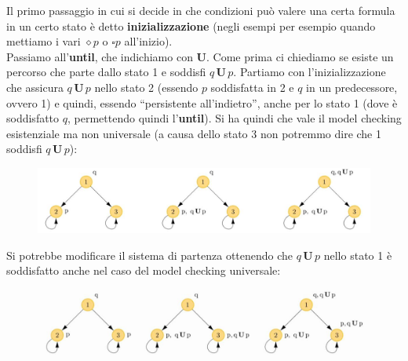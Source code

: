 \documentclass[a4paper,12pt, oneside]{book}
\begin{document}
Il primo passaggio in cui si decide in che condizioni può valere una certa
formula in un certo stato è detto \textbf{inizializzazione} (negli esempi per
esempio quando mettiamo i vari $\diamond p$ o $\square p$ all'inizio).\\
Passiamo all'\textbf{until}, che indichiamo con \textbf{U}. Come prima ci
chiediamo se esiste un percorso che parte dallo stato 1 e soddisfi 
$q\,\mathbf{U}\,p$. Partiamo con l'inizializzazione che assicura
$q\,\mathbf{U}\,p$ nello stato 2 (essendo $p$ soddisfatta in 2 e $q$ in un
predecessore, ovvero 1) e quindi, essendo ``persistente all'indietro'',
anche per lo stato 1 (dove è soddisfatto $q$, permettendo quindi
l'\textbf{until}). Si ha quindi che vale il model checking esistenziale ma non
universale (a causa dello stato 3 non potremmo dire che 1 soddisfi
$q\,\mathbf{U}\,p$):   
\begin{figure}[H]
  \centering
  \includegraphics[scale = 0.3]{img/u1.jpg} 
\end{figure}
\newpage
Si potrebbe modificare il sistema di partenza ottenendo che $q\,\mathbf{U}\,p$
nello stato 1 è soddisfatto anche nel caso del model checking universale:
\begin{figure}[H]
  \centering
  \includegraphics[scale = 0.3]{img/u2.jpg}
\end{figure}
\end{document}
